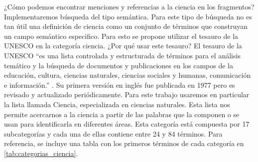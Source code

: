 \documentclass[11pt,a4paper]{article}
\begin{document}
	¿Cómo podemos encontrar menciones y referencias a la ciencia en los fragmentos? Implementaremos búsqueda del tipo semántica. Para este tipo de búsqueda no es tan útil una definición de ciencia como un conjunto de términos que construyan un campo semántico especifico. Para esto se propone utilizar el tesauro de la UNESCO en la categoría ciencia.  
	¿Por qué usar este tesauro? El tesauro de la UNESCO ``es una lista controlada y estructurada de términos para el análisis temático y la búsqueda de documentos y publicaciones en los campos de la educación, cultura, ciencias naturales, ciencias sociales y humanas, comunicación e información.'' \cite{unesco_thesaurus_1977}. 
	Su primera versión en inglés fue publicada en 1977 pero es revisado y actualizado periódicamente. Para este trabajo usaremos en particular la lista llamada Ciencia, especializada en ciencias naturales. Esta lista nos permite acercarnos a la ciencia a partir de las palabras que la componen o se usan para identificarla en diferentes áreas. Esta categoría está compuesta por 17 subcategorías y cada una de ellas contiene entre 24 y 84 términos.
	Para referencia, se incluye una tabla con los primeros términos de cada categoría en \ref{tab:categorias_ciencia}.
	
\end{document}
